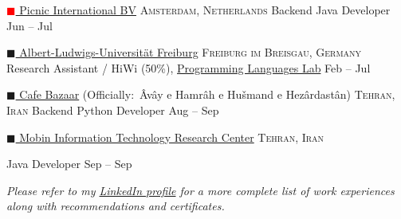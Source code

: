 \documentclass[10pt,a4paper]{article}
\newcommand{\colorsquare}[1]{\textcolor{#1}{$\blacksquare$}}
\begin{document}
\headedsection
  {\href{https://picnic.app/}{\colorsquare{red} Picnic International BV}}
  {\textsc{Amsterdam, Netherlands}} {%
  \headedsubsection
    {Backend Java Developer}
    {Jun  -- Jul }
    {}
}

\headedsection  %
  {\href{http://www.uni-freiburg.de/}{\colorsquare{carolinablue} Albert-Ludwigs-Universität Freiburg}}
  {\textsc{Freiburg im Breisgau, Germany}} {%
  \headedsubsection
    {Research Assistant / HiWi (50\%), \href{http://proglang.informatik.uni-freiburg.de}{Programming Languages Lab}}
    {Feb  -- Jul }
    {}
}

\headedsection  %
  {\href{https://en.wikipedia.org/wiki/Cafe_Bazaar}{\colorsquare{bazaar} Cafe Bazaar} (Officially:\ Âvây e Hamrâh e Hušmand e Hezârdastân)}
  {\textsc{Tehran, Iran}} {%
  \headedsubsection
    {Backend Python Developer}
    {Aug  -- Sep }
    {}
}

\headedsection
  {\href{http://mitrc.ir}{\colorsquare{camouflagegreen} Mobin Information Technology Research Center}}
  {\textsc{Tehran, Iran}} {%

  \headedsubsection
    {Java Developer}
    {Sep  -- Sep }
    {}
}

\vspace{-0.2em}
\begin{center}
  \emph{\small Please refer to my \href{http://www.linkedin.com/in/aerabi}{LinkedIn profile} for a more complete list of work experiences along with recommendations and certificates.}
\end{center}

\spacedhrule{-0.2em}{-0.4em}
\end{document}
